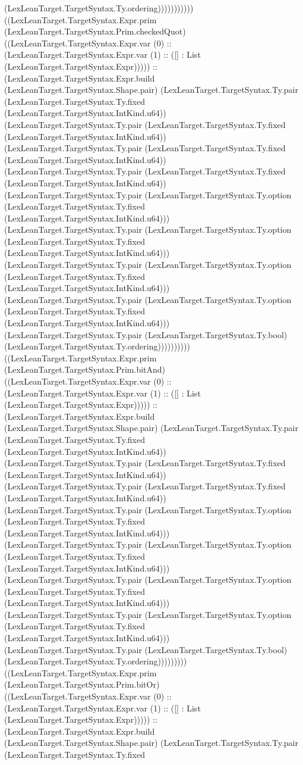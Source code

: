 \documentclass[11pt]{article}
\begin{document}
(LexLeanTarget.TargetSyntax.Ty.ordering))))))))))) ((LexLeanTarget.TargetSyntax.Expr.prim (LexLeanTarget.TargetSyntax.Prim.checkedQuot) ((LexLeanTarget.TargetSyntax.Expr.var (0) :: (LexLeanTarget.TargetSyntax.Expr.var (1) :: ([] : List (LexLeanTarget.TargetSyntax.Expr))))) :: (LexLeanTarget.TargetSyntax.Expr.build (LexLeanTarget.TargetSyntax.Shape.pair) (LexLeanTarget.TargetSyntax.Ty.pair (LexLeanTarget.TargetSyntax.Ty.fixed (LexLeanTarget.TargetSyntax.IntKind.u64)) (LexLeanTarget.TargetSyntax.Ty.pair (LexLeanTarget.TargetSyntax.Ty.fixed (LexLeanTarget.TargetSyntax.IntKind.u64)) (LexLeanTarget.TargetSyntax.Ty.pair (LexLeanTarget.TargetSyntax.Ty.fixed (LexLeanTarget.TargetSyntax.IntKind.u64)) (LexLeanTarget.TargetSyntax.Ty.pair (LexLeanTarget.TargetSyntax.Ty.fixed (LexLeanTarget.TargetSyntax.IntKind.u64)) (LexLeanTarget.TargetSyntax.Ty.pair (LexLeanTarget.TargetSyntax.Ty.option (LexLeanTarget.TargetSyntax.Ty.fixed (LexLeanTarget.TargetSyntax.IntKind.u64))) (LexLeanTarget.TargetSyntax.Ty.pair (LexLeanTarget.TargetSyntax.Ty.option (LexLeanTarget.TargetSyntax.Ty.fixed (LexLeanTarget.TargetSyntax.IntKind.u64))) (LexLeanTarget.TargetSyntax.Ty.pair (LexLeanTarget.TargetSyntax.Ty.option (LexLeanTarget.TargetSyntax.Ty.fixed (LexLeanTarget.TargetSyntax.IntKind.u64))) (LexLeanTarget.TargetSyntax.Ty.pair (LexLeanTarget.TargetSyntax.Ty.option (LexLeanTarget.TargetSyntax.Ty.fixed (LexLeanTarget.TargetSyntax.IntKind.u64))) (LexLeanTarget.TargetSyntax.Ty.pair (LexLeanTarget.TargetSyntax.Ty.bool) (LexLeanTarget.TargetSyntax.Ty.ordering)))))))))) ((LexLeanTarget.TargetSyntax.Expr.prim (LexLeanTarget.TargetSyntax.Prim.bitAnd) ((LexLeanTarget.TargetSyntax.Expr.var (0) :: (LexLeanTarget.TargetSyntax.Expr.var (1) :: ([] : List (LexLeanTarget.TargetSyntax.Expr))))) :: (LexLeanTarget.TargetSyntax.Expr.build (LexLeanTarget.TargetSyntax.Shape.pair) (LexLeanTarget.TargetSyntax.Ty.pair (LexLeanTarget.TargetSyntax.Ty.fixed (LexLeanTarget.TargetSyntax.IntKind.u64)) (LexLeanTarget.TargetSyntax.Ty.pair (LexLeanTarget.TargetSyntax.Ty.fixed (LexLeanTarget.TargetSyntax.IntKind.u64)) (LexLeanTarget.TargetSyntax.Ty.pair (LexLeanTarget.TargetSyntax.Ty.fixed (LexLeanTarget.TargetSyntax.IntKind.u64)) (LexLeanTarget.TargetSyntax.Ty.pair (LexLeanTarget.TargetSyntax.Ty.option (LexLeanTarget.TargetSyntax.Ty.fixed (LexLeanTarget.TargetSyntax.IntKind.u64))) (LexLeanTarget.TargetSyntax.Ty.pair (LexLeanTarget.TargetSyntax.Ty.option (LexLeanTarget.TargetSyntax.Ty.fixed (LexLeanTarget.TargetSyntax.IntKind.u64))) (LexLeanTarget.TargetSyntax.Ty.pair (LexLeanTarget.TargetSyntax.Ty.option (LexLeanTarget.TargetSyntax.Ty.fixed (LexLeanTarget.TargetSyntax.IntKind.u64))) (LexLeanTarget.TargetSyntax.Ty.pair (LexLeanTarget.TargetSyntax.Ty.option (LexLeanTarget.TargetSyntax.Ty.fixed (LexLeanTarget.TargetSyntax.IntKind.u64))) (LexLeanTarget.TargetSyntax.Ty.pair (LexLeanTarget.TargetSyntax.Ty.bool) (LexLeanTarget.TargetSyntax.Ty.ordering))))))))) ((LexLeanTarget.TargetSyntax.Expr.prim (LexLeanTarget.TargetSyntax.Prim.bitOr) ((LexLeanTarget.TargetSyntax.Expr.var (0) :: (LexLeanTarget.TargetSyntax.Expr.var (1) :: ([] : List (LexLeanTarget.TargetSyntax.Expr))))) :: (LexLeanTarget.TargetSyntax.Expr.build (LexLeanTarget.TargetSyntax.Shape.pair) (LexLeanTarget.TargetSyntax.Ty.pair (LexLeanTarget.TargetSyntax.Ty.fixed 
\end{document}
